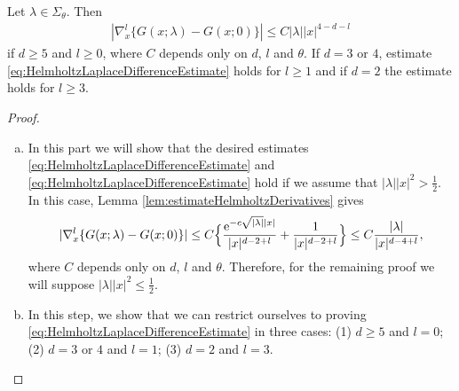 \begin{lem}
  \label{lem:HelmholtzLaplaceDifference}
  Let $\lambda \in \Sigma_\theta$.
  Then
  \begin{align}
    \label{eq:HelmholtzLaplaceDifferenceEstimate}
    |\nabla_x^l \{ G(x; \lambda) - G(x; 0) \}| \leq C |\lambda| |x|^{4 - d - l}
  \end{align}
  if $d \geq 5$ and $l \geq 0$, where $C$ depends only on $d$, $l$ and $\theta$.
  If $d = 3$ or $4$, estimate \eqref{eq:HelmholtzLaplaceDifferenceEstimate} holds for $l \geq 1$ and if $d = 2$ the estimate holds for $l \geq 3$.
\end{lem}

\begin{proof}
  \begin{enumerate}[(a)]
    \item In this part we will show that the desired estimates \eqref{eq:HelmholtzLaplaceDifferenceEstimate} and \eqref{eq:HelmholtzLaplaceDifferenceEstimate} hold if we assume that $|\lambda| |x|^2 > \frac{1}{2}$.
    In this case, Lemma \ref{lem:estimateHelmholtzDerivatives} gives
    \begin{align*}
      |\nabla_x^l \{ G(x; \lambda) - G(x; 0) \} |
      \leq C \Big\{ \frac{\mathrm{e}^{-c \sqrt{|\lambda|} |x|}}{|x|^{d - 2 + l}} + \frac{1}{|x|^{d - 2 + l}} \Big\} \leq C \frac{|\lambda|}{|x|^{d - 4 + l}},
    \end{align*}
    where $C$ depends only on $d$, $l$ and $\theta$.
    Therefore, for the remaining proof we will suppose $|\lambda||x|^2 \leq \frac{1}{2}$.
  \item In this step, we show that we can restrict ourselves to proving \eqref{eq:HelmholtzLaplaceDifferenceEstimate} in three cases: (1) $d \geq 5$ and $l = 0$; (2) $d = 3$ or $4$ and $l = 1$; (3) $d = 2$ and $l = 3$.
    

\end{enumerate}
\end{proof}
